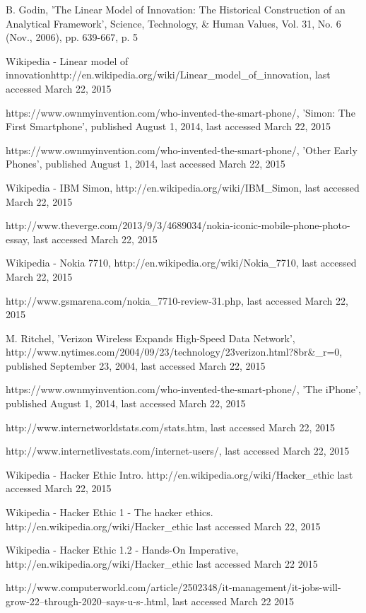 \documentclass[paper=a4, fontsize=12pt]{scrartcl} %
\numberwithin{equation}{section} %
\numberwithin{figure}{section} %
\numberwithin{table}{section} %
\begin{document}
\begin{thebibliography}{99}
		B. Godin, 'The Linear Model of Innovation: The Historical Construction of an Analytical Framework', Science, Technology, \& Human Values, Vol. 31, No. 6 (Nov., 2006), pp. 639-667, p. 5
		
		Wikipedia - Linear model of innovationhttp://en.wikipedia.org/wiki/Linear\_model\_of\_innovation, last accessed March 22, 2015
		
		https://www.ownmyinvention.com/who-invented-the-smart-phone/, 'Simon: The First Smartphone', published August 1, 2014, last accessed March 22, 2015
		
		https://www.ownmyinvention.com/who-invented-the-smart-phone/, 'Other Early Phones', published August 1, 2014, last accessed March 22, 2015
		
		Wikipedia - IBM Simon, http://en.wikipedia.org/wiki/IBM\_Simon, last accessed March 22, 2015
		
		http://www.theverge.com/2013/9/3/4689034/nokia-iconic-mobile-phone-photo-essay, last accessed March 22, 2015
		
		Wikipedia - Nokia 7710, http://en.wikipedia.org/wiki/Nokia\_7710, last accessed March 22, 2015
		
		http://www.gsmarena.com/nokia\_7710-review-31.php, last accessed March 22, 2015
		
		M. Ritchel, 'Verizon Wireless Expands High-Speed Data Network', http://www.nytimes.com/2004/09/23/technology/23verizon.html?8br\&\_r=0, published September 23, 2004, last accessed March 22, 2015
		
		https://www.ownmyinvention.com/who-invented-the-smart-phone/, 'The iPhone', published August 1, 2014, last accessed March 22, 2015
		
		http://www.internetworldstats.com/stats.htm, last accessed March 22, 2015
		
		http://www.internetlivestats.com/internet-users/, last accessed March 22, 2015
		
		Wikipedia - Hacker Ethic Intro. http://en.wikipedia.org/wiki/Hacker\_ethic last accessed March 22, 2015
		
		Wikipedia - Hacker Ethic 1 - The hacker ethics. http://en.wikipedia.org/wiki/Hacker\_ethic last accessed March 22, 2015
		
		Wikipedia - Hacker Ethic 1.2 - Hands-On Imperative, http://en.wikipedia.org/wiki/Hacker\_ethic last accessed March 22 2015
		
		http://www.computerworld.com/article/2502348/it-management/it-jobs-will-grow-22--through-2020--says-u-s-.html, last accessed March 22 2015
	\end{thebibliography}
\end{document}
